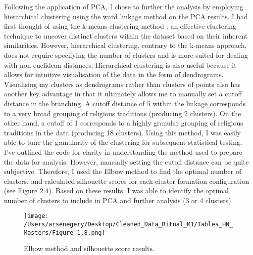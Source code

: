 \documentclass[12pt]{report}
\begin{document}
Following the application of PCA, I chose to further the analysis by employing hierarchical clustering using the ward linkage method on the PCA results. I had first thought of using the k-means clustering method ; an effective clustering technique to uncover distinct clusters within the dataset based on their inherent similarities. However, hierarchical clustering, contrary to the k-means approach, does not require specifying the number of clusters and is more suited for dealing with non-euclidean distances. Hierarchical clustering is also useful because it allows for intuitive visualisation of the data in the form of dendrograms. Visualising my clusters as dendrograms rather than clusters of points also has another key advantage in that it ultimately allows me to manually set a cutoff distance in the branching. A cutoff distance of 5 within the linkage corresponds to a very broad grouping of religious traditions (producing 2 clusters). On the other hand, a cutoff of 1 corresponds to a highly granular grouping of religious traditions in the data (producing 18 clusters). Using this method, I was easily able to tune the granularity of the clustering for subsequent statistical testing. I’ve outlined the code for clarity in understanding the method used to prepare the data for analysis. However, manually setting the cutoff distance can be quite subjective. Therefore, I used the Elbow method to find the optimal number of clusters, and calculated silhouette scores for each cluster formation configuration (see Figure 2.4). Based on these results, I was able to identify the optimal number of clusters to include in PCA and further analysis (3 or 4 clusters).\\

\begin{figure}[htbp]
	\centering
	\texttt{[image: /Users/arsenegery/Desktop/Cleaned\_Data\_Ritual\_M1/Tables\_HN\_Masters/Figure\_1.8.png]} %
	\caption{Elbow method and silhouette score results.} 
	\label{fig:table8}
\end{figure}
\end{document}
